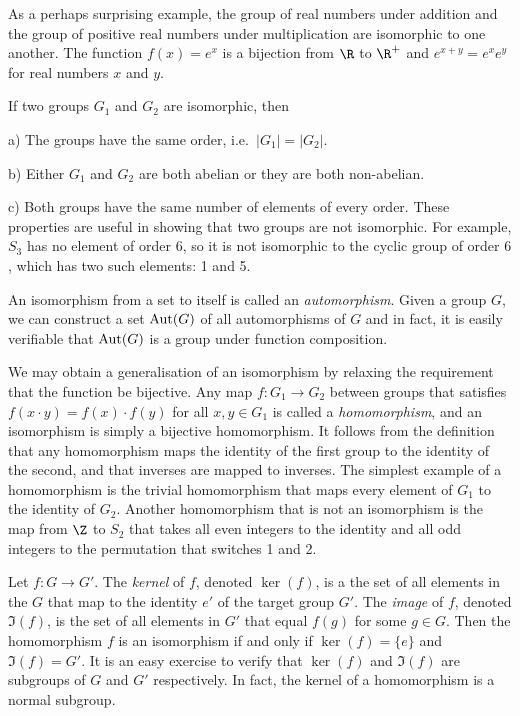 As a perhaps surprising example, the group of real numbers under addition and the group of positive real numbers under multiplication are isomorphic to one another. The function $f(x) = e^x$ is a bijection from $\R$ to $\R^+$ and $e^{x+y} = e^xe^y$ for real numbers $x$ and $y$.

If two groups $G_1$ and $G_2$ are isomorphic, then
\medskip
\item {a)} The groups have the same order, i.e.\ $|G_1| = |G_2|$.
\smallskip
\item {b)} Either $G_1$ and $G_2$ are both abelian or they are both non-abelian.
\smallskip
\item {c)} Both groups have the same number of elements of every order.
\medskip
These properties are useful in showing that two groups are not isomorphic. For example, $S_3$ has no element of order $6$, so it is not isomorphic to the cyclic group of order $6$, which has two such elements: 1 and 5.

An isomorphism from a set to itself is called an {\it automorphism}. Given a group $G$, we can construct a set $\mathop{\rm Aut}\nolimits(G)$ of all automorphisms of $G$ and in fact, it is easily verifiable that $\mathop{\rm Aut}\nolimits(G)$ is a group under function composition.

We may obtain a generalisation of an isomorphism by relaxing the requirement that the function be bijective. Any map $f : G_1 \rightarrow G_2$ between groups that satisfies $f(x\cdot y) = f(x)\cdot f(y)$ for all $x,y\in G_1$ is called a {\it homomorphism}, and an isomorphism is simply a bijective homomorphism. It follows from the definition that any homomorphism maps the identity of the first group to the identity of the second, and that inverses are mapped to inverses. The simplest example of a homomorphism is the trivial homomorphism that maps every element of $G_1$ to the identity of $G_2$. Another homomorphism that is not an isomorphism is the map from $\Z$ to $S_2$ that takes all even integers to the identity and all odd integers to the permutation that switches 1 and 2.

Let $f:G\rightarrow G'$. The {\it kernel} of $f$, denoted $\ker(f)$, is a the set of all elements in the $G$ that map to the identity $e'$ of the target group $G'$. The {\it image} of $f$, denoted $\Im(f)$, is the set of all elements in $G'$ that equal $f(g)$ for some $g\in G$. Then the homomorphism $f$ is an isomorphism if and only if $\ker(f) = \{e\}$ and $\Im(f) = G'$. It is an easy exercise to verify that $\ker(f)$ and $\Im(f)$ are subgroups of $G$ and $G'$ respectively. In fact, the kernel of a homomorphism is a normal subgroup.


